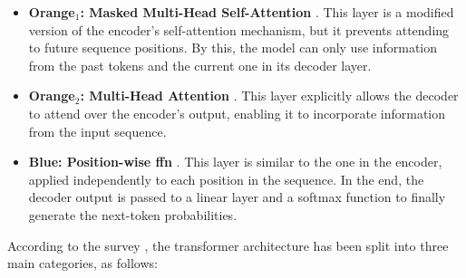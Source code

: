 \begin{itemize}
    \item \textbf{Orange$_1$: Masked Multi-Head Self-Attention} \cite{vaswani_attention_2017}. This layer is a modified version of the encoder's self-attention mechanism, but it prevents attending to future sequence positions. By this, the model can only use information from the past tokens and the current one in its decoder layer.
    \item \textbf{Orange$_2$: Multi-Head Attention} \cite{vaswani_attention_2017}. This layer explicitly allows the decoder to attend over the encoder's output, enabling it to incorporate information from the input sequence.
    \item \textbf{Blue: Position-wise \ac{ffn}} \cite{vaswani_attention_2017}. This layer is similar to the one in the encoder, applied independently to each position in the sequence. In the end, the decoder output is passed to a linear layer and a softmax function to finally generate the next-token probabilities.
\end{itemize}

\pagebreak

 According to the survey \cite{shao_survey_2024}, the transformer architecture has been split into three main categories, as follows:

